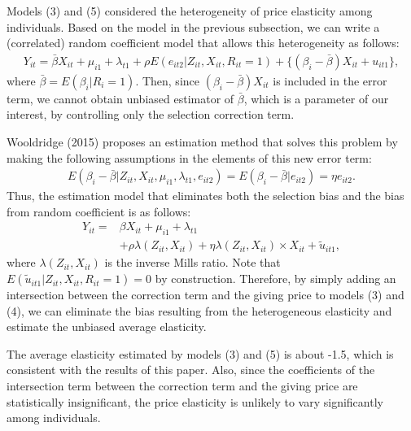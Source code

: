 \documentclass[
  11pt,
  a4paper,
]{article}
\begin{document}
Models (3) and (5) considered
the heterogeneity of price elasticity among individuals.
Based on the model in the previous subsection,
we can write a (correlated) random coefficient model
that allows this heterogeneity as follows:
\begin{align}
  Y_{it} = \bar{\beta} X_{it} + \mu_{i1} + \lambda_{t1}
  + \rho E(e_{it2} | Z_{it}, X_{it}, R_{it} = 1)
  + \{(\beta_i - \bar{\beta}) X_{it} +  u_{it1}\},
\end{align}
where \(\bar{\beta} = E(\beta_i | R_i = 1)\).
Then, since \((\beta_i - \bar{\beta}) X_{it}\) is included in the error term,
we cannot obtain unbiased estimator of \(\bar{\beta}\),
which is a parameter of our interest,
by controlling only the selection correction term.

Wooldridge (2015) proposes an estimation method that solves this problem
by making the following assumptions in the elements of this new error term:
\begin{align}
  E(\beta_i - \bar{\beta} | Z_{it}, X_{it}, \mu_{i1}, \lambda_{t1}, e_{it2})
  = E(\beta_i - \bar{\beta} | e_{it2}) = \eta e_{it2}.
\end{align}
Thus, the estimation model that eliminates both the selection bias and
the bias from random coefficient is as follows:
\begin{align}
  Y_{it} =& \beta  X_{it} + \mu_{i1} + \lambda_{t1} \\
  &+ \rho \lambda(Z_{it}, X_{it}) + \eta \lambda(Z_{it}, X_{it}) \times X_{it}
  + \tilde{u}_{it1},
\end{align}
where \(\lambda(Z_{it}, X_{it})\) is the inverse Mills ratio.
Note that \(E(\tilde{u}_{it1} | Z_{it}, X_{it}, R_{it} = 1) = 0\)
by construction.
Therefore,
by simply adding an intersection
between the correction term and the giving price to models (3) and (4),
we can eliminate the bias resulting from the heterogeneous elasticity
and estimate the unbiased average elasticity.

The average elasticity estimated by models (3) and (5) is about -1.5,
which is consistent with the results of this paper.
Also, since the coefficients of the intersection term
between the correction term and the giving price
are statistically insignificant,
the price elasticity is unlikely to vary significantly among individuals.
\end{document}

